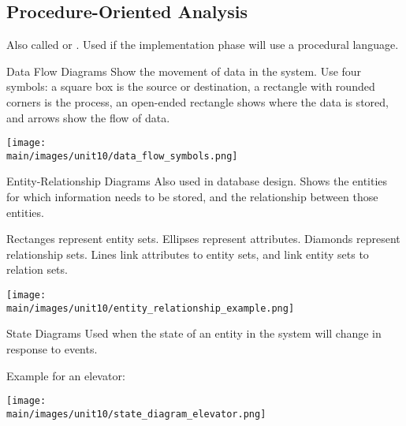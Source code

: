 \documentclass[\main/notes.tex]{subfiles}
\begin{document}
			\subsection{Procedure-Oriented Analysis}
				Also called  or . Used if the implementation phase will use a procedural language.
				\begin{definition}{Data Flow Diagrams}
					Show the movement of data in the system. Use four symbols: a square box is the source or destination, a rectangle with rounded corners is the process, an open-ended rectangle shows where the data is stored, and arrows show the flow of data.
					\begin{center}
						\texttt{[image: \\main/images/unit10/data\_flow\_symbols.png]}
					\end{center}
				\end{definition}
				\begin{definition}{Entity-Relationship Diagrams}
					Also used in database design. Shows the entities for which information needs to be stored, and the relationship between those entities.

					Rectanges represent entity sets. Ellipses represent attributes. Diamonds represent relationship sets. Lines link attributes to entity sets, and link entity sets to relation sets.

					\begin{center}
						\texttt{[image: \\main/images/unit10/entity\_relationship\_example.png]}
					\end{center}
				\end{definition}
				\pagebreak
				\begin{definition}{State Diagrams}
					Used when the state of an entity in the system will change in response to events.

					Example for an elevator:
					\begin{center}
						\texttt{[image: \\main/images/unit10/state\_diagram\_elevator.png]}
					\end{center}
				\end{definition}
\end{document}
